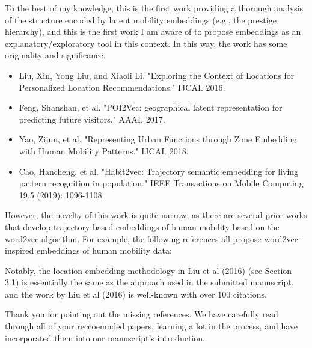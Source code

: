 \documentclass[12pt,a4paper]{article}
\newcommand{\response}[1]{{\leavevmode\noindent #1}}
\newcommand{\rcomment}[1]{%
\vspace{10pt}
\begin{tcolorbox}[colback=black!3,colframe=white!45!black]
#1
\end{tcolorbox}
}
\begin{document}
\rcomment{%
To the best of my knowledge, this is the first work providing a thorough analysis of the structure encoded by latent mobility embeddings (e.g., the prestige hierarchy), and this is the first work I am aware of to propose embeddings as an explanatory/exploratory tool in this context. In this way, the work has some originality and significance.


\begin{itemize}
	\item Liu, Xin, Yong Liu, and Xiaoli Li. "Exploring the Context of Locations for Personalized Location Recommendations." IJCAI. 2016.
\item Feng, Shanshan, et al. "POI2Vec: geographical latent representation for predicting future visitors." AAAI. 2017.
\item Yao, Zijun, et al. "Representing Urban Functions through Zone Embedding with Human Mobility Patterns." IJCAI. 2018.
\item Cao, Hancheng, et al. "Habit2vec: Trajectory semantic embedding for living pattern recognition in population." IEEE Transactions on Mobile Computing 19.5 (2019): 1096-1108.
\end{itemize}




However, the novelty of this work is quite narrow, as there are several prior works that develop trajectory-based embeddings of human mobility based on the word2vec algorithm. For example, the following references all propose word2vec-inspired embeddings of human mobility data:


Notably, the location embedding methodology in Liu et al (2016) (see Section 3.1) is essentially the same as the approach used in the submitted manuscript, and the work by Liu et al (2016) is well-known with over 100 citations.
}



\response{%
Thank you for pointing out the missing references. 
We have carefully read through all of your reccoemnded papers, learning a lot in the process, and have incorporated them into our manuscript's introduction.
}
\end{document}
